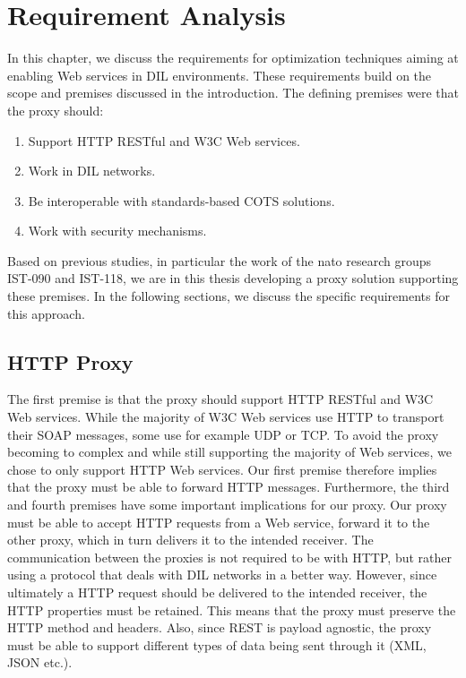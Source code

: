 \chapter{Requirement Analysis}
\label{chapter:requirements}

In this chapter, we discuss the requirements for optimization techniques aiming
at enabling Web services in DIL environments. These requirements build on the
scope and premises discussed in the introduction. The defining premises were
that the proxy should:

\begin{enumerate}
    \item Support HTTP RESTful and W3C Web services.
    \item Work in DIL networks.
    \item Be interoperable with standards-based COTS solutions.
    \item Work with security mechanisms.
\end{enumerate}

Based on previous studies, in particular the work of the \gls{nato} research
groups IST-090 and IST-118, we are in this thesis developing a proxy solution
supporting these premises. In the following sections, we discuss the specific
requirements for this approach.

\section{HTTP Proxy}

The first premise is that the proxy should support HTTP RESTful and W3C Web
services. While the majority of W3C Web services use HTTP to transport their
SOAP messages, some use for example UDP or TCP. To avoid the proxy becoming to
complex and while still supporting the majority of Web services, we chose to
only support HTTP Web services. Our first premise therefore implies that the
proxy must be able to forward HTTP messages. Furthermore, the third and fourth
premises have some important implications for our proxy. Our proxy must be able
to accept HTTP requests from a Web service, forward it to the other proxy, which
in turn delivers it to the intended receiver. The communication between the
proxies is not required to be with HTTP, but rather using a protocol that deals
with DIL networks in a better way. However, since ultimately a HTTP request
should be delivered to the intended receiver, the HTTP properties must be
retained. This means that the proxy must preserve the HTTP method and headers.
Also, since REST is payload agnostic, the proxy must be able to support
different types of data being sent through it (XML, JSON etc.).

